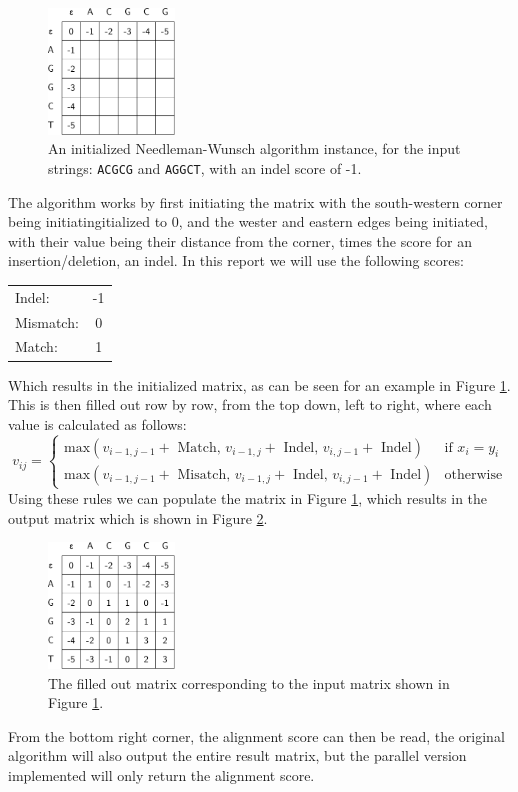\begin{figure}
  \center
  \includegraphics[width=0.3\textwidth]{fig/fig3.pdf}
  \caption{An initialized Needleman-Wunsch algorithm instance, for the input strings: \texttt{ACGCG} and \texttt{AGGCT}, with an indel score of -1.}
  \label{fig3}
\end{figure}
The algorithm works by first initiating the matrix with the south-western corner being initiatingitialized to $0$, and the wester and eastern edges being initiated, with their value being their distance from the corner, times the score for an insertion/deletion, an indel. In this report we will use the following scores:
\begin{center}
  \begin{tabular}{lc}
    Indel: & -1\\
    Mismatch: & 0\\
    Match: & 1
  \end{tabular}
\end{center}
Which results in the initialized matrix, as can be seen for an example in Figure \ref{fig3}. This is then filled out row by row, from the top down, left to right, where each value is calculated as follows:
$$
  v_{ij} =
  \begin{cases}
    \mbox{max}(v_{i-1,j-1} + \mbox{ Match, } v_{i-1,j} + \mbox{ Indel, } v_{i,j-1} + \mbox{ Indel}) & \text{if } x_i = y_i \\
    \mbox{max}(v_{i-1,j-1} + \mbox{ Misatch, } v_{i-1,j} + \mbox{ Indel, } v_{i,j-1} + \mbox{ Indel}) & \text{otherwise} %
  \end{cases}
$$
Using these rules we can populate the matrix in Figure \ref{fig3}, which results in the output matrix which is shown in Figure \ref{fig4}.
\begin{figure}[H]
  \center
  \includegraphics[width=0.3\textwidth]{fig/fig4.pdf}
  \caption{The filled out matrix corresponding to the input matrix shown in Figure \ref{fig3}.}
  \label{fig4}
\end{figure}
From the bottom right corner, the alignment score can then be read, the original algorithm will also output the entire result matrix, but the parallel version implemented will only return the alignment score.
